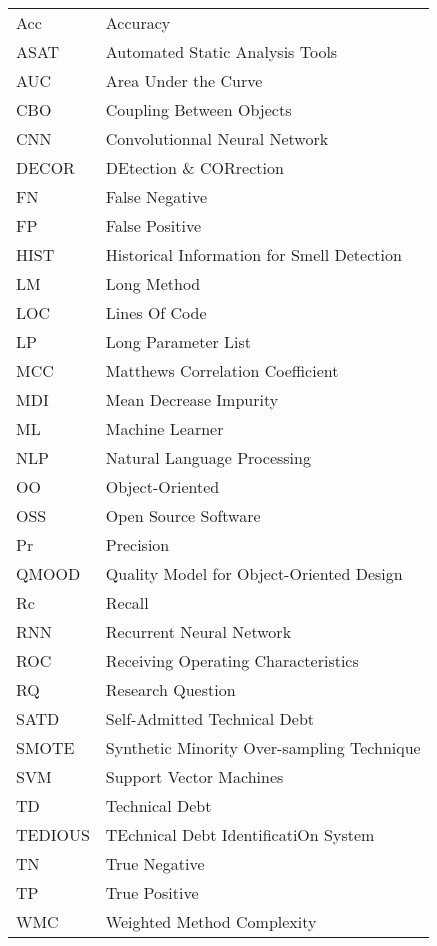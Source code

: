 \begin{longtable}{lp{5in}}
Acc			    & Accuracy\\	
ASAT		  & Automated Static Analysis Tools\\		
AUC			  & Area Under the Curve\\	
CBO			  & Coupling Between Objects\\	
CNN			  & Convolutionnal Neural Network\\	
DECOR	    & DEtection \& CORrection\\			
FN				& False Negative\\
FP				& False Positive\\
HIST		   & Historical Information for Smell Detection\\		
LM				& Long Method\\
LOC			   & Lines Of Code\\	
LP				 & Long Parameter List\\
MCC			  & Matthews Correlation Coefficient\\	
MDI			    & Mean Decrease Impurity\\	
ML				& Machine Learner\\
NLP			   & Natural Language Processing\\	
OO			   & Object-Oriented\\	
OSS			   & Open Source Software\\	
Pr				 & Precision\\
QMOOD	   & Quality Model for Object-Oriented Design\\			
Rc				 & Recall\\
RNN			   & Recurrent Neural Network\\	
ROC			  & Receiving Operating Characteristics\\	
RQ				& Research Question\\
SATD		 & Self-Admitted Technical Debt\\		
SMOTE		& Synthetic Minority Over-sampling Technique\\		
SVM			  & Support Vector Machines\\	
TD			    & Technical Debt\\	
TEDIOUS	   & TEchnical Debt IdentificatiOn System\\			
TN				& True Negative\\
TP				& True Positive\\
WMC			 & Weighted Method Complexity\\	
\end{longtable}

